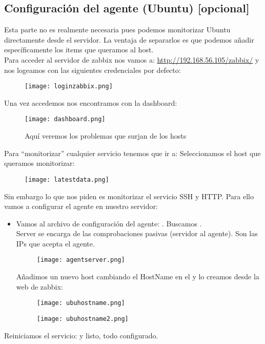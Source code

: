 \subsection{Configuración del agente (Ubuntu) [opcional]}
Esta parte no es realmente necesaria pues podemos monitorizar Ubuntu directamente desde el servidor. La ventaja de separarlos es que podemos añadir específicamente los items que queramos al host.\\

Para acceder al servidor de zabbix nos vamos a: \url{http://192.168.56.105/zabbix/} y nos logeamos con las siguientes credenciales por defecto:
	\begin{figure}[H]
	\centering
	\texttt{[image: loginzabbix.png]} 
	\end{figure}
Una vez accedemos nos encontramos con la dashboard:
	\begin{figure}[H]
	\centering
	\texttt{[image: dashboard.png]} 
	\caption{Aquí veremos los problemas que surjan de los hosts}
	\end{figure}

Para “monitorizar” cualquier servicio tenemos que ir a: 
Seleccionamos el host que queramos monitorizar:
	\begin{figure}[H]
	\centering
	\texttt{[image: latestdata.png]} 
	\end{figure}

Sin embargo lo que nos piden es monitorizar el servicio SSH y HTTP. Para ello vamos a configurar el agente en nuestro servidor:

\begin{itemize}
	\item Vamos al archivo de configuración del agente: . Buscamos . \\
	Server se encarga de las comprobaciones pasivas (servidor al agente). Son las IPs que acepta el agente.
	
	\begin{figure}[H]
	\centering
	\texttt{[image: agentserver.png]} 
	\end{figure}

Añadimos un nuevo host cambiando el HostName en el  y lo creamos desde la web de zabbix:
	\begin{figure}[H]
		\centering
		\texttt{[image: ubuhostname.png]} 
	\end{figure}
	\begin{figure}[H]
	\centering
	\texttt{[image: ubuhostname2.png]} 
	\end{figure}
\end{itemize}
Reiniciamos el servicio:  y listo, todo configurado.

